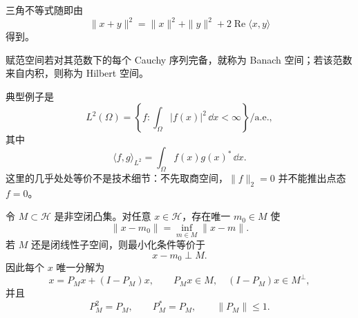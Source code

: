 三角不等式随即由
\[
\|x+y\|^2
=\|x\|^2+\|y\|^2+2\operatorname{Re}\langle x,y\rangle
\]
得到。

\begin{definition}
赋范空间若对其范数下的每个 Cauchy 序列完备，就称为 Banach 空间；若该范数来自内积，则称为 Hilbert 空间。
\end{definition}

典型例子是
\[
L^2(\Omega)=\left\{f:\int_\Omega |f(x)|^2\,\dd x<\infty\right\}/\text{a.e.},
\]
其中
\[
{\langle f,g\rangle_{L^2}
=\int_\Omega f(x)g(x)^*\,\dd x}.
\]
这里的几乎处处等价不是技术细节：不先取商空间，$\|f\|_2=0$ 并不能推出点态 $f=0$。
\begin{theorem}[闭凸集的投影与正交分解]
令 $M\subset\mathcal H$ 是非空闭凸集。对任意 $x\in\mathcal H$，存在唯一 $m_0\in M$ 使
\[
\|x-m_0\|=\inf_{m\in M}\|x-m\|.
\]
若 $M$ 还是闭线性子空间，则最小化条件等价于
\[
{x-m_0\perp M}.
\]
因此每个 $x$ 唯一分解为
\[
x=P_Mx+(I-P_M)x,
\qquad
P_Mx\in M,
\quad
(I-P_M)x\in M^\perp,
\]
并且
\[
P_M^2=P_M,
\qquad
P_M^*=P_M,
\qquad
\|P_M\|\le1.
\]
\end{theorem}

